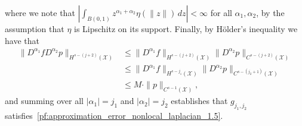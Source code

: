 \documentclass[aos]{imsart}
\theoremstyle{plain}
\theoremstyle{definition}
\theoremstyle{remark}
\newcommand{\mc}[1]{\mathcal{#1}}
\newcommand{\1}{\mathbf{1}}
\begin{document}
where we note that $|\int_{B(0,1)} z^{\alpha_1 + \alpha_2} \eta(\|z\|) \,dz| < \infty$ for all $\alpha_1, \alpha_2$, by the assumption that $\eta$ is Lipschitz on its support. Finally, by H\"{o}lder's inequality we have that
\begin{align*}
\|D^{\alpha_1}f D^{\alpha_2}p\|_{H^{s - (j + 2)}(\mc{X})} & \leq \|D^{\alpha_1}f\|_{H^{s - (j + 2)}(\mc{X})} \|D^{\alpha_2}p\|_{C^{s - (j + 2)}(\mc{X})} \\
& \leq \|D^{\alpha_1}f\|_{H^{s - j_1}(\mc{X})} \|D^{\alpha_2}p\|_{C^{s - (j_2 + 1)}(\mc{X})} \\
& \leq M \cdot \|p\|_{C^{s - 1}(\mc{X})},
\end{align*}
and summing over all $|\alpha_1| = j_1$ and $|\alpha_2| = j_2$ establishes that $g_{j_1,j_2}$ satisfies~\eqref{pf:approximation_error_nonlocal_laplacian_1.5}.
\end{document}
